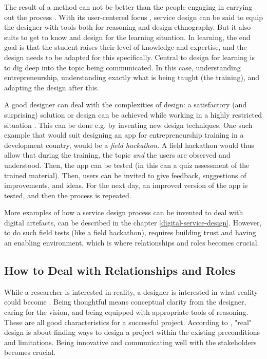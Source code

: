 The result of a method can not be better than the people engaging in carrying out the process \citep{lowgren}. With its user-centered focus \citep{stickdorn}, service design can be said to equip the designer with tools both for reasoning and design ethnography. But it also suits to get to know and design for the learning situation. In learning, the end goal is that the student raises their level of knowledge and expertise, and the design needs to be adapted for this specifically. Central to design for learning is to dig deep into the topic being communicated. In this case, understanding entrepreneurship, understanding exactly what is being taught (the training), and adapting the design after this.

A good designer can deal with the complexities of design: a satisfactory (and surprising) solution or design can be achieved while working in a highly restricted situation \citep{lowgren}. This can be done e.g. by inventing new design techniques. One such example that would suit designing an app for entrepreneurship training in a development country, would be a \textit{field hackathon}. A field hackathon would thus allow that during the training, the topic \textit{and} the users are observed and understood. Then, the app can be tested (in this can a quiz assessment of the trained material). Then, users can be invited to give feedback, suggestions of improvements, and  ideas. For the next day, an improved version of the app is tested, and then the process is repeated.

More examples of how a service design process can be invented to deal with digital artefacts, can be described in the chapter \ref{digital-service-design}. However, to do such field tests (like a field hackathon), requires building trust and having an enabling environment, which is where relationships and roles becomes crucial.

\subsection{How to Deal with Relationships and Roles}
While a researcher is interested in reality, a designer is interested in what reality could become \citep{lowgren}. Being thoughtful means conceptual clarity from the designer, caring for the vision, and being equipped with appropriate tools of reasoning. These are all good characteristics for a successful project. According to \cite{lowgren}, "real" design is about finding ways to design a project within the existing preconditions and limitations. Being innovative and communicating well with the stakeholders becomes crucial.

